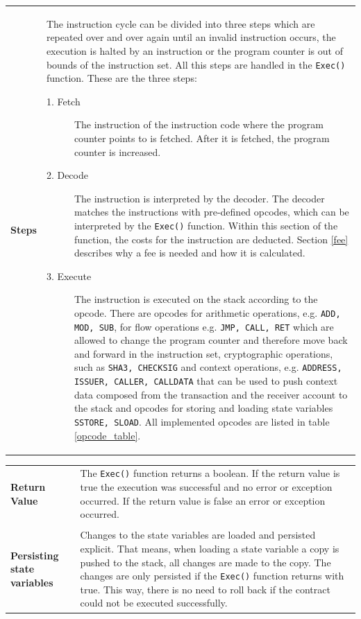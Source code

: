 \begin{tabular}[t]{ p{3cm} p{12.5cm}}
\textbf{Steps} &
The instruction cycle can be divided into three steps which are repeated over and over again until an invalid instruction occurs, the execution is halted by an instruction or the program counter is out of bounds of the instruction set. All this steps are handled in the \texttt{Exec()} function. These are the three steps:
\begin{description}
  \item[1. Fetch] The instruction of the instruction code where the program counter points to is fetched. After it is fetched, the program counter is increased.
  \item[2. Decode] The instruction is interpreted by the decoder. The decoder matches the instructions with pre-defined opcodes, which can be interpreted by the \texttt{Exec()} function. Within this section of the function, the costs for the instruction are deducted. Section \ref{fee} describes why a fee is needed and how it is calculated.
    \item[3. Execute] The instruction is executed on the stack according to the opcode. There are opcodes for arithmetic operations, e.g. \texttt{ADD, MOD, SUB}, for flow operations e.g. \texttt{JMP, CALL, RET} which are allowed to change the program counter and therefore move back and forward in the instruction set, cryptographic operations, such as \texttt{SHA3, CHECKSIG} and context operations, e.g. \texttt{ADDRESS, ISSUER, CALLER, CALLDATA} that can be used to push context data composed from the transaction and the receiver account to the stack and opcodes for storing and loading state variables \texttt{SSTORE, SLOAD}. All implemented opcodes are listed in table \ref{opcode_table}.
    \end{description}    
\end{tabular}

\begin{tabular}[t]{ p{3cm} p{12.5cm}}
\raggedright
\textbf{Return Value} &
The \texttt{Exec()} function returns a boolean. If the return value is true the execution was successful and no error or exception occurred. If the return value is false an error or exception occurred. \\ \\

\textbf{Persisting state variables} &
Changes to the state variables are loaded and persisted explicit. That means, when loading a state variable a copy is pushed to the stack, all changes are made to the copy. The changes are only persisted if the \texttt{Exec()} function returns with true. This way, there is no need to roll back if the contract could not be executed successfully.
\end{tabular}


